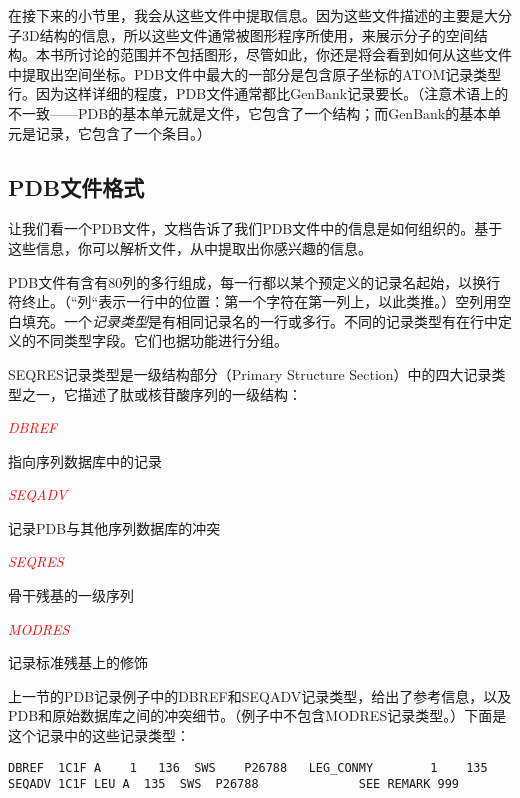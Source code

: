 在接下来的小节里，我会从这些文件中提取信息。因为这些文件描述的主要是大分子3D结构的信息，所以这些文件通常被图形程序所使用，来展示分子的空间结构。本书所讨论的范围并不包括图形，尽管如此，你还是将会看到如何从这些文件中提取出空间坐标。PDB文件中最大的一部分是包含原子坐标的ATOM记录类型行。因为这样详细的程度，PDB文件通常都比GenBank记录要长。（注意术语上的不一致——PDB的基本单元就是文件，它包含了一个结构；而GenBank的基本单元是记录，它包含了一个条目。）

\subsection{PDB文件格式}
让我们看一个PDB文件，文档告诉了我们PDB文件中的信息是如何组织的。基于这些信息，你可以解析文件，从中提取出你感兴趣的信息。

PDB文件有含有80列的多行组成，每一行都以某个预定义的记录名起始，以换行符终止。（“列“表示一行中的位置：第一个字符在第一列上，以此类推。）空列用空白填充。一个\textit{记录类型}是有相同记录名的一行或多行。不同的记录类型有在行中定义的不同类型字段。它们也据功能进行分组。

SEQRES记录类型是一级结构部分（Primary Structure Section）中的四大记录类型之一，它描述了肽或核苷酸序列的一级结构：

\textcolor{red}{\textit{DBREF}}
\begin{adjustwidth}{4em}{}
指向序列数据库中的记录
\end{adjustwidth}

\textcolor{red}{\textit{SEQADV}}
\begin{adjustwidth}{4em}{}
记录PDB与其他序列数据库的冲突
\end{adjustwidth}

\textcolor{red}{\textit{SEQRES}}
\begin{adjustwidth}{4em}{}
骨干残基的一级序列
\end{adjustwidth}

\textcolor{red}{\textit{MODRES}}
\begin{adjustwidth}{4em}{}
记录标准残基上的修饰
\end{adjustwidth}

上一节的PDB记录例子中的DBREF和SEQADV记录类型，给出了参考信息，以及PDB和原始数据库之间的冲突细节。（例子中不包含MODRES记录类型。）下面是这个记录中的这些记录类型：

\begin{lstlisting}
DBREF  1C1F A    1   136  SWS    P26788   LEG_CONMY        1    135             
SEQADV 1C1F LEU A  135  SWS  P26788              SEE REMARK 999 
\end{lstlisting}


